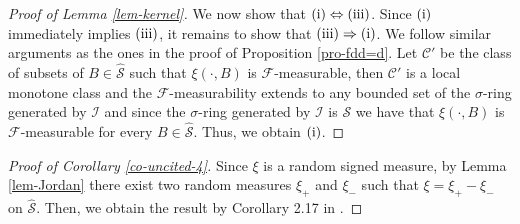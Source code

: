\documentclass{article}
\theoremstyle{plain}
\theoremstyle{remark}
\begin{document}
\begin{proof}[Proof of Lemma \ref{lem-kernel}]
	We now show that $\textnormal{(i)}\Leftrightarrow\textnormal{(iii)}$. Since $\textnormal{(i)}$ immediately implies $\textnormal{(iii)}$, it remains to show that $\textnormal{(iii)}\Rightarrow\textnormal{(i)}$. We follow similar arguments as the ones in the proof of Proposition \ref{pro-fdd=d}. Let $\mathcal{C}'$ be the class of subsets of $B\in\hat{\mathcal{S}}$ such that $\xi(\cdot,B)$ is $\mathcal{F}$-measurable, then $\mathcal{C}'$ is a local monotone class and the $\mathcal{F}$-measurability extends to any bounded set of the $\sigma$-ring generated by $\mathcal{I}$ and since the $\sigma$-ring generated by $\mathcal{I}$ is $\mathcal{S}$ we have that $\xi(\cdot,B)$ is $\mathcal{F}$-measurable for every $B\in\hat{\mathcal{S}}$. Thus, we obtain $\textnormal{(i)}$.
\end{proof}


\begin{proof}[Proof of Corollary \ref{co-uncited-4}]
	Since $\xi$ is a random signed measure, by Lemma \ref{lem-Jordan} there exist two random measures $\xi_+$ and $\xi_-$ such that $\xi=\xi_+-\xi_-$ on $\hat{\mathcal{S}}$. Then, we obtain the result by Corollary 2.17 in \cite{Kallenberg2}.
\end{proof}
\end{document}
